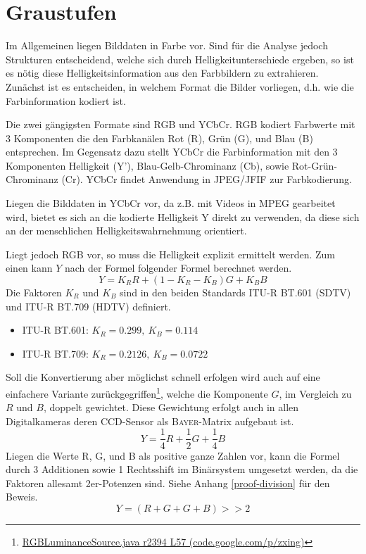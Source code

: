 \section{Graustufen}
\label{sec:grayscaling}
\writtenby{\dcauthornameewie}%
Im Allgemeinen liegen Bilddaten in Farbe vor.
Sind für die Analyse jedoch Strukturen entscheidend, welche sich durch Helligkeitunterschiede ergeben, so ist es nötig diese Helligkeitsinformation aus den Farbbildern zu extrahieren.
Zunächst ist es entscheiden, in welchem Format die Bilder vorliegen, d.h. wie die Farbinformation kodiert ist.

Die zwei gängigsten Formate sind RGB und YCbCr.
RGB kodiert Farbwerte mit 3 Komponenten die den Farbkanälen Rot (R), Grün (G), und Blau (B) entsprechen.
Im Gegensatz dazu stellt YCbCr die Farbinformation mit den 3 Komponenten Helligkeit (Y'), Blau-Gelb-Chrominanz (Cb), sowie Rot-Grün-Chrominanz (Cr).
YCbCr findet Anwendung in JPEG/JFIF \cite{jfif} zur Farbkodierung.

Liegen die Bilddaten in YCbCr vor, da z.B. mit Videos in MPEG gearbeitet wird, bietet es sich an die kodierte Helligkeit Y direkt zu verwenden, da diese sich an der menschlichen Helligkeitswahrnehmung orientiert.

Liegt jedoch RGB vor, so muss die Helligkeit explizit ermittelt werden.
Zum einen kann $Y$ nach der Formel folgender Formel \cite[2.5.1]{itu/rec/601} berechnet werden.
\begin{equation}
  Y = K_R R + (1 - K_R - K_B) G + K_B B
\end{equation}
Die Faktoren $K_R$ und $K_B$ sind in den beiden Standards ITU-R BT.601 (SDTV) und ITU-R BT.709 (HDTV) definiert.
%
\begin{itemize}
\item ITU-R BT.601: $K_R=0.299,~K_B=0.114$ \cite[2.5.1]{itu/rec/601}
\item ITU-R BT.709: $K_R=0.2126,~K_B=0.0722$ \cite[4]{itu/rec/709}
\end{itemize}
%
Soll die Konvertierung aber möglichst schnell erfolgen wird auch auf eine einfachere Variante zurückgegriffen\footnote{\href{https://code.google.com/p/zxing/source/browse/trunk/core/src/com/google/zxing/RGBLuminanceSource.java?spec=svn2633&r=2394\#57}{RGBLuminanceSource.java r2394 L57 (code.google.com/p/zxing)}}, welche die Komponente $G$, im Vergleich zu $R$ und $B$, doppelt gewichtet.
Diese Gewichtung erfolgt auch in allen Digitalkameras deren CCD-Sensor als \textsc{Bayer}-Matrix aufgebaut ist.
\begin{equation}
  Y = \frac{1}{4} R + \frac{1}{2} G + \frac{1}{4}B
\end{equation}
Liegen die Werte R, G, und B als positive ganze Zahlen vor, kann die Formel durch 3 Additionen sowie 1 Rechtsshift im Binärsystem umgesetzt werden, da die Faktoren allesamt 2er-Potenzen sind.
Siehe Anhang \ref{proof-division} für den Beweis.
\begin{equation}
  Y = (R + G + G + B) >\!\!> 2
\end{equation}
